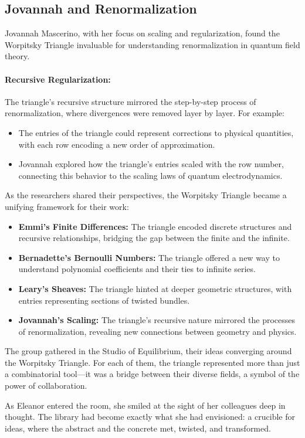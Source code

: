 \subsection*{Jovannah and Renormalization}
Jovannah Mascerino, with her focus on scaling and regularization, found the Worpitsky Triangle invaluable for understanding renormalization in quantum field theory.

\paragraph{Recursive Regularization:} The triangle’s recursive structure mirrored the step-by-step process of renormalization, where divergences were removed layer by layer. For example:
\begin{itemize}
    \item The entries of the triangle could represent corrections to physical quantities, with each row encoding a new order of approximation.
    \item Jovannah explored how the triangle’s entries scaled with the row number, connecting this behavior to the scaling laws of quantum electrodynamics.
\end{itemize}

As the researchers shared their perspectives, the Worpitsky Triangle became a unifying framework for their work:
\begin{itemize}
    \item \textbf{Emmi’s Finite Differences:} The triangle encoded discrete structures and recursive relationships, bridging the gap between the finite and the infinite.
    \item \textbf{Bernadette’s Bernoulli Numbers:} The triangle offered a new way to understand polynomial coefficients and their ties to infinite series.
    \item \textbf{Leary’s Sheaves:} The triangle hinted at deeper geometric structures, with entries representing sections of twisted bundles.
    \item \textbf{Jovannah’s Scaling:} The triangle’s recursive nature mirrored the processes of renormalization, revealing new connections between geometry and physics.
\end{itemize}

The group gathered in the Studio of Equilibrium, their ideas converging around the Worpitsky Triangle. For each of them, the triangle represented more than just a combinatorial tool—it was a bridge between their diverse fields, a symbol of the power of collaboration.
\bigskip

As Eleanor entered the room, she smiled at the sight of her colleagues deep in thought. The library had become exactly what she had envisioned: a crucible for ideas, where the abstract and the concrete met, twisted, and transformed.





